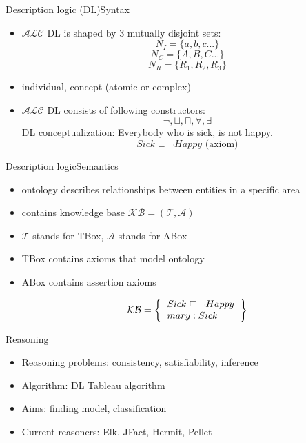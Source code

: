 \documentclass{beamer}
\begin{document}
\begin{frame}{Description logic (DL)}{Syntax}
	\begin{itemize}
	\item {
		$\mathcal{ALC}$ DL is shaped by 3 mutually disjoint sets:
		\[ N_{I} = \{ a,b,c... \} \]
		\[ N_{C} = \{ A,B,C... \} \]
		\[N_{R} = \{ R_{1}, R_{2}, R_{3} \} \]
	}
	
	\item {
		individual, concept (atomic or complex)
	}		
	
	\item {
		$\mathcal{ALC}$ DL consists of following constructors:
		\[ \neg, \sqcup, \sqcap, \forall, \exists \]
		DL conceptualization: Everybody who is sick, is not happy.
		\[ Sick \sqsubseteq \neg Happy \text{ (axiom)} \]
	}
	\end{itemize}
\end{frame}

\begin{frame}{Description logic}{Semantics}
	\begin{itemize}
				
		\item {
			ontology describes relationships between entities in a specific area
		}
		
		\item {
			contains knowledge base $\mathcal{KB} = (\mathcal{T}, \mathcal{A})$	
		}
		
		\item {
			$\mathcal{T}$ stands for TBox, $\mathcal{A}$ stands for ABox
		}
		
		\item {
			TBox contains axioms that model ontology
		}
		
		\item {
			ABox contains assertion axioms
		}
		
		\[ 
		\mathcal{KB} = \left\{
		\begin{tabular}{l c}
		$Sick \sqsubseteq \neg Happy$ \\
		$mary: Sick$ \\
		\end{tabular}
		\right \}
		\]

	\end{itemize}
\end{frame}

\begin{frame}{Reasoning}
	\begin{itemize}
		\item {
			Reasoning problems: consistency, satisfiability, inference
		}
		
		\item {
			Algorithm: DL Tableau algorithm
		}
		
		\item {
			Aims: finding model, classification
		}
		
		\item {
			Current reasoners: Elk, JFact, Hermit, Pellet
		}
	\end{itemize}
\end{frame}
\end{document}
